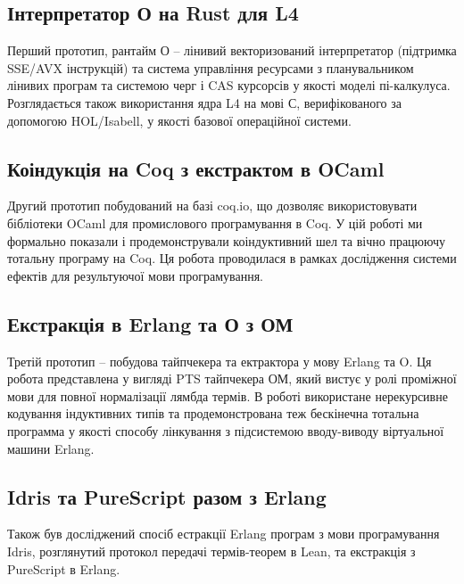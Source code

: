 \subsection{Інтерпретатор О на Rust для L4}
Перший прототип, рантайм О -- лінивий
векторизований інтерпретатор (підтримка SSE/AVX інструкцій) та система
управління ресурсами з планувальником лінивих програм
та системою черг і CAS курсорсів у якості моделі пі-калкулуса. Розглядається також
використання ядра L4 на мові С, верифікованого за допомогою HOL/Isabell,
у якості базової операційної системи.

\subsection{Коіндукція на Coq з екстрактом в OCaml}
Другий прототип побудований на базі coq.io, що дозволяє
використовувати бібліотеки OCaml для промислового програмування в Coq.
У цій роботі ми формально показали і продемонстрували коіндуктивний шел
та вічно працюючу тотальну програму на Coq. Ця робота проводилася
в рамках дослідження системи ефектів для результуючої мови програмування.

\subsection{Екстракція в Erlang та О з ОМ}
Третій прототип -- побудова тайпчекера та ектрактора у мову Erlang та O.
Ця робота представлена у вигляді PTS тайпчекера ОМ, який вистує у ролі
проміжної мови для повної нормалізації лямбда термів. В роботі використане
нерекурсивне кодування індуктивних типів та продемонстрована теж бескінечна
тотальна программа у якості способу лінкування з підсистемою вводу-виводу
віртуальної машини Erlang.

\subsection*{Idris та PureScript разом з Erlang}
Також був досліджений спосіб естракції Erlang програм з мови програмування
Idris, розглянутий протокол передачі термів-теорем в Lean,
та екстракція з PureScript в Erlang.


